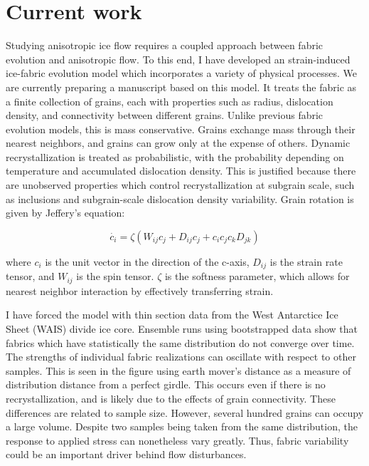 \documentclass{report}
\begin{document}
\section{Current work}
Studying anisotropic ice flow requires a coupled approach between fabric evolution and anisotropic flow. To this end, I have developed an strain-induced ice-fabric evolution model which incorporates a variety of physical processes. We are currently preparing a manuscript based on this model. It treats the fabric as a finite collection of grains, each with properties such as radius, dislocation density, and connectivity between different grains. Unlike previous fabric evolution models, this is mass conservative. Grains exchange mass through their nearest neighbors, and grains can grow only at the expense of others. Dynamic recrystallization is treated as probabilistic, with the probability depending on temperature and accumulated dislocation density. This is justified because there are unobserved properties which control recrystallization at subgrain scale, such as inclusions and subgrain-scale dislocation density variability. Grain rotation is given by Jeffery's equation: 

\begin{equation}
   \dot{c_i} = \zeta \left( W_{ij}  c_j + D_{ij} c_j + c_i c_j c_k D_{jk} \right)
\end{equation}

where $c_i$ is the unit vector in the direction of the c-axis, $D_{ij}$ is the strain rate tensor, and $W_{ij}$ is the spin tensor. $\zeta$ is the softness parameter, which allows for nearest neighbor interaction by effectively transferring strain.

I have forced the model with thin section data from the West Antarctice Ice Sheet (WAIS) divide ice core. Ensemble runs using bootstrapped data show that fabrics which have statistically the same distribution do not converge over time. The strengths of individual fabric realizations can oscillate with respect to other samples. This is seen in the figure using earth mover's distance as a measure of distribution distance from a perfect girdle. This occurs even if there is no recrystallization, and is likely due to the effects of grain connectivity. These differences are related to sample size. However, several hundred grains can occupy a large volume. Despite two samples being taken from the same distribution, the response to applied stress can nonetheless vary greatly. Thus, fabric variability could be an important driver behind flow disturbances. 
\end{document}
